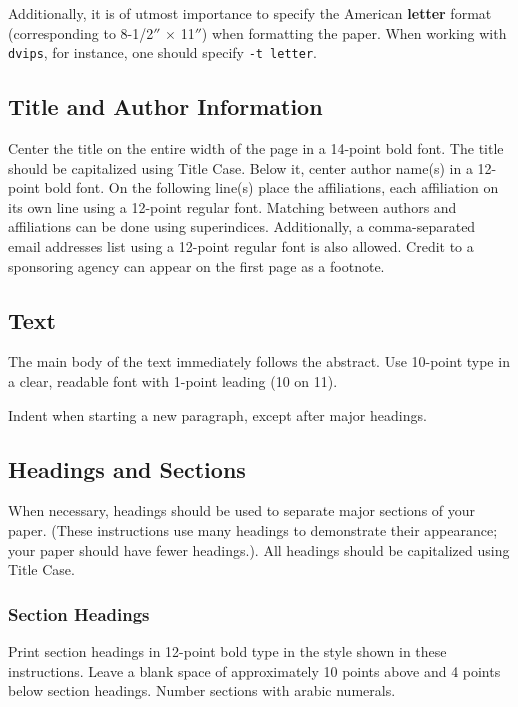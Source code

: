 \documentclass{article}
\begin{document}
Additionally, it is of utmost importance to specify the American {\bf
letter} format (corresponding to 8-1/2$''$ $\times$ 11$''$) when
formatting the paper. When working with {\tt dvips}, for instance, one
should specify {\tt -t letter}.

\subsection{Title and Author Information}

Center the title on the entire width of the page in a 14-point bold
font. The title should be capitalized using Title Case. Below it, center author name(s) in a 12-point bold font. On the following line(s) place the affiliations, each affiliation on its own line using a 12-point regular font. Matching between authors and affiliations can be done using superindices. Additionally, a comma-separated email addresses list using a 12-point regular font is also allowed. Credit to a
sponsoring agency can appear on the first page as a footnote.

\subsection{Text}

The main body of the text immediately follows the abstract. Use
10-point type in a clear, readable font with 1-point leading (10 on
11).

Indent when starting a new paragraph, except after major headings.

\subsection{Headings and Sections}

When necessary, headings should be used to separate major sections of
your paper. (These instructions use many headings to demonstrate their
appearance; your paper should have fewer headings.). All headings should be capitalized using Title Case.

\subsubsection{Section Headings}

Print section headings in 12-point bold type in the style shown in
these instructions. Leave a blank space of approximately 10 points
above and 4 points below section headings.  Number sections with
arabic numerals.
\end{document}
